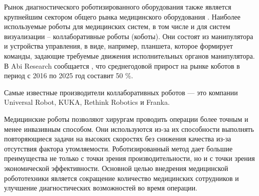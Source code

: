 Рынок диагностического роботизированного оборудования также является крупнейшим сектором общего рынка медицинского оборудования \cite{litlink4}. Наиболее используемые роботы для медицинских систем, в том числе и для систем визуализации – коллаборативные роботы (коботы). Они состоят из манипулятора и устройства управления, в виде, например, планшета, которое формирует команды, задающие требуемые движения исполнительных органов манипулятора. В Abi Research сообщается  \cite{litlink4}, что среднегодовой прирост на рынке коботов в период с 2016 по 2025 год составит 50 \%.

Самые известные производители коллаборативных роботов — это компании Universal Robot, KUKA, Rethink Robotics и Franka. 

Медицинские роботы позволяют хирургам проводить операции более точным и менее инвазивным способом. Они используются из-за их способности выполнять повторяющиеся задачи на высоких скоростях без снижения качества из-за отсутствия фактора утомляемости. Роботизированный метод дает большие преимущества не только с точки зрения производительности, но и с точки зрения экономической эффективности. Основной целью внедрения медицинской робототехники является сокращение количество медицинских сотрудников и улучшение диагностических возможностей во время операции. 


